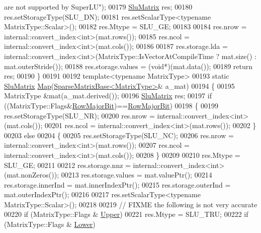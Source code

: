\begin{DoxyCode}
{       are not supported by SuperLU"});
00179     \hyperlink{struct_eigen_1_1_slu_matrix}{SluMatrix} res;
00180     res.setStorageType(SLU\_DN);
00181     res.setScalarType<\textcolor{keyword}{typename} MatrixType::Scalar>();
00182     res.Mtype     = SLU\_GE;
00183 
00184     res.nrow      = internal::convert\_index<int>(mat.rows());
00185     res.ncol      = internal::convert\_index<int>(mat.cols());
00186 
00187     res.storage.lda       = internal::convert\_index<int>(MatrixType::IsVectorAtCompileTime ? mat.size() : 
      mat.outerStride());
00188     res.storage.values    = (\textcolor{keywordtype}{void}*)(mat.data());
00189     \textcolor{keywordflow}{return} res;
00190   \}
00191 
00192   \textcolor{keyword}{template}<\textcolor{keyword}{typename} MatrixType>
00193   \textcolor{keyword}{static} \hyperlink{struct_eigen_1_1_slu_matrix}{SluMatrix} \hyperlink{group___core___module_class_eigen_1_1_map}{Map}(\hyperlink{group___sparse_core___module_class_eigen_1_1_sparse_matrix_base}{SparseMatrixBase<MatrixType>}& a\_mat)
00194   \{
00195     MatrixType &mat(a\_mat.derived());
00196     \hyperlink{struct_eigen_1_1_slu_matrix}{SluMatrix} res;
00197     \textcolor{keywordflow}{if} ((MatrixType::Flags&\hyperlink{group__flags_gae4f56c2a60bbe4bd2e44c5b19cbe8762}{RowMajorBit})==\hyperlink{group__flags_gae4f56c2a60bbe4bd2e44c5b19cbe8762}{RowMajorBit})
00198     \{
00199       res.setStorageType(SLU\_NR);
00200       res.nrow      = internal::convert\_index<int>(mat.cols());
00201       res.ncol      = internal::convert\_index<int>(mat.rows());
00202     \}
00203     \textcolor{keywordflow}{else}
00204     \{
00205       res.setStorageType(SLU\_NC);
00206       res.nrow      = internal::convert\_index<int>(mat.rows());
00207       res.ncol      = internal::convert\_index<int>(mat.cols());
00208     \}
00209 
00210     res.Mtype       = SLU\_GE;
00211 
00212     res.storage.nnz       = internal::convert\_index<int>(mat.nonZeros());
00213     res.storage.values    = mat.valuePtr();
00214     res.storage.innerInd  = mat.innerIndexPtr();
00215     res.storage.outerInd  = mat.outerIndexPtr();
00216 
00217     res.setScalarType<\textcolor{keyword}{typename} MatrixType::Scalar>();
00218 
00219     \textcolor{comment}{// FIXME the following is not very accurate}
00220     \textcolor{keywordflow}{if} (MatrixType::Flags & \hyperlink{group__enums_gga39e3366ff5554d731e7dc8bb642f83cda6bcb58be3b8b8ec84859ce0c5ac0aaec}{Upper})
00221       res.Mtype = SLU\_TRU;
00222     \textcolor{keywordflow}{if} (MatrixType::Flags & \hyperlink{group__enums_gga39e3366ff5554d731e7dc8bb642f83cda891792b8ed394f7607ab16dd716f60e6}{Lower})

\end{DoxyCode}

